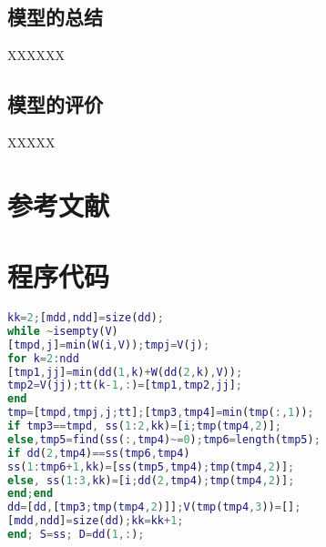 \documentclass[bwprint]{gmcmthesis}
\numberwithin{figure}{section}
\begin{document}
\subsection{模型的总结} \par
XXXXXX
\subsection{模型的评价} \par
XXXXX


\section{参考文献}



\newpage
\appendix
\section{程序代码}
\begin{lstlisting}[language=Matlab] 
kk=2;[mdd,ndd]=size(dd);
while ~isempty(V)
[tmpd,j]=min(W(i,V));tmpj=V(j);
for k=2:ndd
[tmp1,jj]=min(dd(1,k)+W(dd(2,k),V));
tmp2=V(jj);tt(k-1,:)=[tmp1,tmp2,jj];
end
tmp=[tmpd,tmpj,j;tt];[tmp3,tmp4]=min(tmp(:,1));
if tmp3==tmpd, ss(1:2,kk)=[i;tmp(tmp4,2)];
else,tmp5=find(ss(:,tmp4)~=0);tmp6=length(tmp5);
if dd(2,tmp4)==ss(tmp6,tmp4)
ss(1:tmp6+1,kk)=[ss(tmp5,tmp4);tmp(tmp4,2)];
else, ss(1:3,kk)=[i;dd(2,tmp4);tmp(tmp4,2)];
end;end
dd=[dd,[tmp3;tmp(tmp4,2)]];V(tmp(tmp4,3))=[];
[mdd,ndd]=size(dd);kk=kk+1;
end; S=ss; D=dd(1,:);
 \end{lstlisting}
\end{document}
